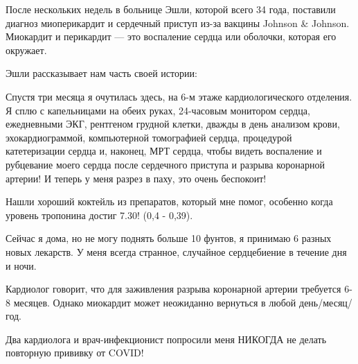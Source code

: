 После нескольких недель в больнице Эшли, которой всего 34 года, поставили
диагноз миоперикардит и сердечный приступ из-за вакцины Johnson \&
Johnson. Миокардит и перикардит — это воспаление сердца или оболочки, которая
его окружает.

Эшли рассказывает нам часть своей истории:

Спустя три месяца я очутилась здесь, на 6-м этаже кардиологического отделения. Я
сплю с капельницами на обеих руках, 24-часовым монитором сердца, ежедневными
ЭКГ, рентгеном грудной клетки, дважды в день анализом крови, эхокардиограммой,
компьютерной томографией сердца, процедурой катетеризации сердца и, наконец, МРТ
сердца, чтобы видеть воспаление и рубцевание моего сердца после сердечного
приступа и разрыва коронарной артерии! И теперь у меня разрез в паху, это очень
беспокоит!

Нашли хороший коктейль из препаратов, который мне помог, особенно когда уровень
тропонина достиг 7.30! (0,4 - 0,39).

Сейчас я дома, но не могу поднять больше 10 фунтов, я принимаю 6 разных новых
лекарств. У меня всегда странное, случайное сердцебиение в течение дня и ночи.

Кардиолог говорит, что для заживления разрыва коронарной артерии требуется 6-8
месяцев. Однако миокардит может неожиданно вернуться в любой день/месяц/год.

Два кардиолога и врач-инфекционист попросили меня НИКОГДА не делать повторную
прививку от COVID!
